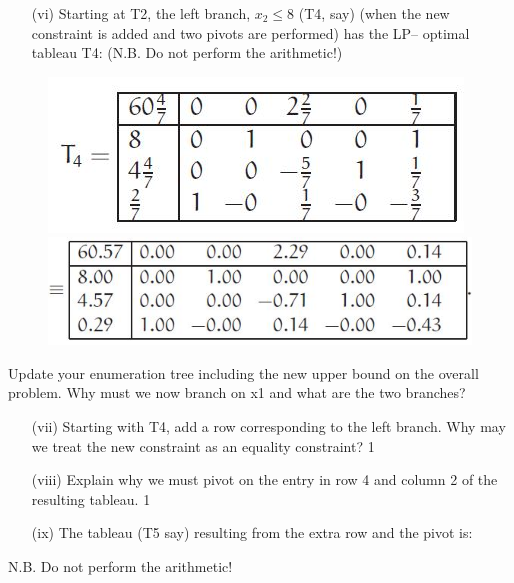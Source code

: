 \documentclass{beamer}
\begin{document}
\begin{frame}
	
\begin{itemize}
\item[(vi)] Starting at T2, the left branch, $x_2 \leq 8$ (T4, say) (when the new
constraint is added and two pivots are performed) has the LP–
optimal tableau T4: (N.B. Do not perform the arithmetic!)
\end{itemize}


\end{frame}
\begin{frame}
\begin{figure}
\centering
\includegraphics[width=0.7\linewidth]{Exam14-f}\\
\includegraphics[width=0.7\linewidth]{Exam14-g}
\end{figure}
\end{frame}
\begin{frame}
\large
Update your enumeration tree including the new upper bound on
the overall problem. Why must we now branch on x1 and what
are the two branches? 



\end{frame}
\begin{frame}
\begin{itemize}
\item[(vii)] Starting with T4, add a row corresponding to the left branch. Why
may we treat the new constraint as an equality constraint? 1%
\item[(viii)] Explain why we must pivot on the entry in row 4 and column 2 of
the resulting tableau. 1%
\item[(ix)] The tableau (T5 say) resulting from the extra row and the pivot is:
\end{itemize}

N.B. Do not perform the arithmetic!


\end{frame}
\end{document}
